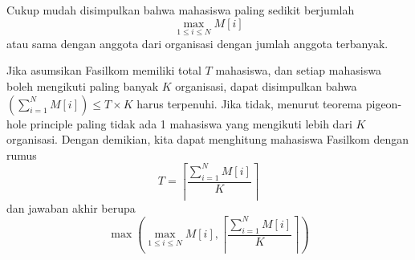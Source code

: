 \documentclass[../main_editorial.tex]{subfiles} %
\begin{document}
Cukup mudah disimpulkan bahwa mahasiswa paling sedikit berjumlah $$\max_{1 \le i \le N} M[i]$$ atau sama dengan anggota dari organisasi dengan jumlah anggota terbanyak.

Jika asumsikan Fasilkom memiliki total $T$ mahasiswa, dan setiap mahasiswa boleh mengikuti paling banyak $K$ organisasi, dapat disimpulkan bahwa $(\sum_{i=1}^N M[i]) \le T \times K$ harus terpenuhi. Jika tidak, menurut teorema pigeon-hole principle paling tidak ada 1 mahasiswa yang mengikuti lebih dari $K$ organisasi. Dengan demikian, kita dapat menghitung mahasiswa Fasilkom dengan rumus $$T = \left \lceil{\frac{\sum_{i=1}^N M[i]}{K}}\right \rceil$$ dan jawaban akhir berupa $$\max \left ( \max_{1 \le i \le N} M[i],\left \lceil{\frac{\sum_{i=1}^N M[i]}{K}}\right \rceil \right )$$
\end{document}

